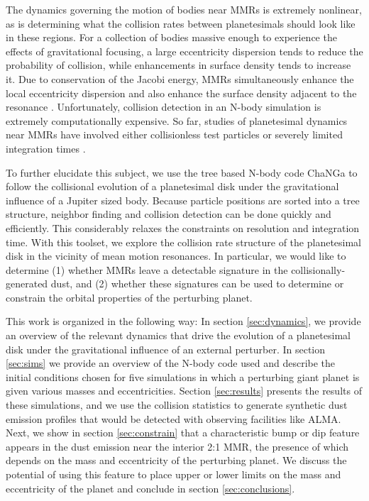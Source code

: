 \documentclass[twocolumn]{aastex63}
\begin{document}
The dynamics governing the motion of bodies near MMRs is extremely nonlinear, as is determining what the collision rates between planetesimals 
should look like in these regions. For a collection of bodies massive enough to experience the effects of gravitational focusing, a large eccentricity 
dispersion tends to reduce the probability of collision, while enhancements in surface density tends to increase it. Due to conservation of the Jacobi 
energy, MMRs simultaneously enhance the local eccentricity dispersion and also enhance the surface density adjacent to the resonance 
\citep{2000Icar..143...45R, 2017ApJ...850..103B}. Unfortunately, collision detection in an N-body simulation is extremely computationally expensive. 
So far, studies of planetesimal dynamics near MMRs have involved either collisionless test particles 
\citep{2017ApJ...850..103B, 2016ApJ...818..159T, 2018ApJ...857....3T} or severely limited integration times \citep{2000Icar..143...45R}.

To further elucidate this subject, we use the tree based N-body code {\sc ChaNGa}\citep{2008IEEEpds...ChaNGa, 2015AphCom..2..1} to follow the 
collisional evolution of a planetesimal disk under the gravitational influence of a Jupiter sized body. Because particle positions are sorted into a tree 
structure, neighbor finding and collision detection can be done quickly and efficiently. This considerably relaxes the constraints on resolution and 
integration time. With this toolset, we explore the collision rate structure of the planetesimal disk in the vicinity of mean motion resonances. In 
particular, we would like to determine (1) whether MMRs leave a detectable signature in the collisionally-generated dust, and (2) whether these 
signatures can be used to determine or constrain the orbital properties of the perturbing planet.

This work is organized in the following way: In section \ref{sec:dynamics}, we provide an overview of the relevant dynamics that drive the evolution 
of a planetesimal disk under the gravitational influence of an external perturber. In section \ref{sec:sims} we provide an overview of the N-body code 
used and describe the initial conditions chosen for five simulations in which a perturbing giant planet is given various masses 
and eccentricities. Section \ref{sec:results} presents the results of these simulations, and we use the collision statistics to generate synthetic dust 
emission profiles that would be detected with observing facilities like ALMA. Next, we show in section \ref{sec:constrain} that a characteristic bump 
or dip feature appears in the dust emission near the interior 2:1 MMR, the presence of which depends on the mass and eccentricity of the perturbing 
planet. We discuss the potential of using this feature to place upper
or lower limits on the mass and eccentricity of the planet and conclude in section 
\ref{sec:conclusions}.
\end{document}
